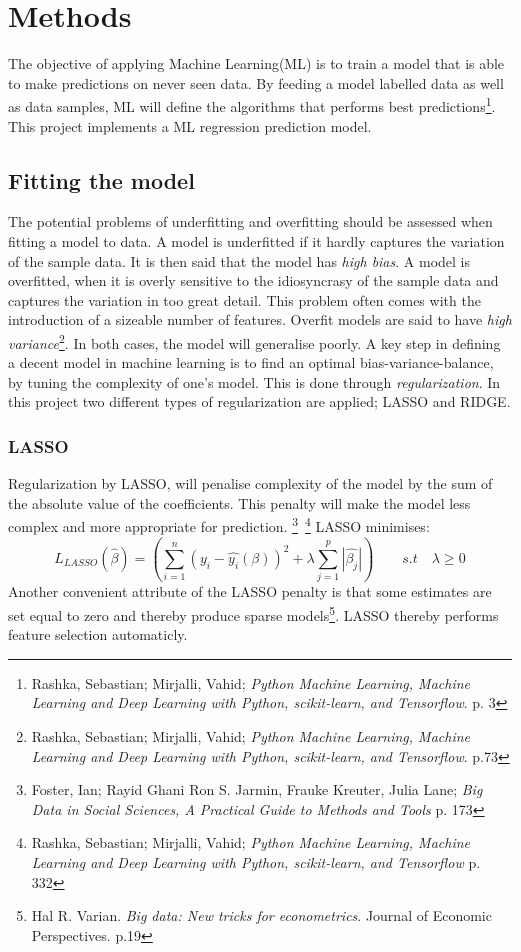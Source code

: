 \documentclass[12pt,a4paper]{article}
\begin{document}
\section{Methods}
The objective of applying Machine Learning(ML) is to train a model that is able to make predictions on never seen data. By feeding a model labelled data as well as data samples, ML will define the algorithms that performs best predictions\footnote{Rashka, Sebastian; Mirjalli, Vahid; \textit{Python Machine Learning, Machine Learning and Deep Learning with Python, scikit-learn, and Tensorflow}. p. 3}. This project implements a ML regression prediction model.
\subsection{Fitting the model}
The potential problems of underfitting and overfitting should be assessed when fitting a model to data. A model is underfitted if it hardly captures the variation of the sample data. It is then said that the model has \textit{high bias}. A model is overfitted, when it is overly sensitive to the idiosyncrasy of the sample data and captures the variation in too great detail. This problem often comes with the introduction of a sizeable number of features. Overfit models are said to have \textit{high variance}\footnote{Rashka, Sebastian; Mirjalli, Vahid; \textit{Python Machine Learning, Machine Learning and Deep Learning with Python, scikit-learn, and Tensorflow}. p.73}. In both cases, the model will generalise poorly. A key step in defining a decent model in machine learning is to find an optimal bias-variance-balance, by tuning the complexity of one’s model. This is done through \textit{regularization}. In this project two different types of regularization are applied; LASSO and RIDGE.

\subsubsection{LASSO}
Regularization by LASSO, will penalise complexity of the model by the sum of the absolute value of the coefficients. This penalty will make the model less complex and more appropriate for prediction.  \footnote{Foster, Ian; Rayid Ghani Ron S. Jarmin, Frauke Kreuter, Julia Lane; \textit{Big Data in Social Sciences, A Practical Guide to Methods and Tools} p. 173}\, \footnote{Rashka, Sebastian; Mirjalli, Vahid; \textit{Python Machine Learning, Machine Learning and Deep Learning with Python, scikit-learn, and Tensorflow} p. 332}
\newline LASSO minimises: $$L_{LASSO}(\hat{\beta}) = \left(\sum_{i=1}^{n} (y_i-\hat{y_i}(\beta))^2+\lambda\sum_{j=1}^{p}|\hat{\beta_j}|\right) \qquad s.t \quad \lambda \geq 0 $$
Another convenient attribute of the LASSO penalty is that some estimates are set equal to zero and thereby produce sparse models\footnote{Hal R. Varian. \textit{Big data: New tricks for econometrics}. Journal of Economic Perspectives. p.19}. LASSO thereby performs feature selection automaticly.   
\end{document}
